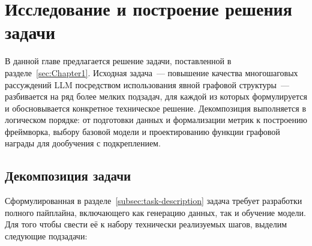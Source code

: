 

\section{Исследование и построение решения задачи}
\label{sec:Chapter3} 

В данной главе предлагается решение задачи, поставленной в разделе~\ref{sec:Chapter1}. Исходная задача~--- повышение качества многошаговых рассуждений LLM посредством использования явной графовой структуры~--- разбивается на ряд более мелких подзадач, для каждой из которых формулируется и обосновывается конкретное техническое решение. Декомпозиция выполняется в логическом порядке: от подготовки данных и формализации метрик к построению фреймворка, выбору базовой модели и проектированию функции графовой награды для дообучения с подкреплением.

\subsection{Декомпозиция задачи}
\label{subsec:decomposition}

Сформулированная в разделе~\ref{subsec:task-description} задача требует разработки полного пайплайна, включающего как генерацию данных, так и обучение модели. Для того чтобы свести её к набору технически реализуемых шагов, выделим следующие подзадачи:

